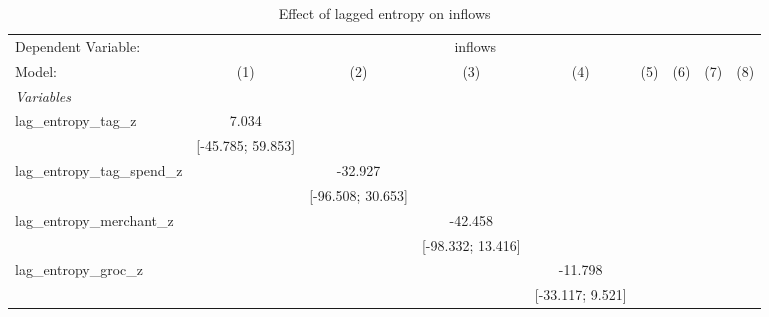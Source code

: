 
\begin{table}[htbp]
   \centering
   \tiny
   \begin{threeparttable}[b]
      \caption{\label{tab:reg_inflows_lagged} Effect of lagged entropy on inflows}
      \begin{tabular}{lcccccccc}
         \tabularnewline \midrule \midrule
         Dependent Variable: & \multicolumn{8}{c}{inflows}\\
         Model:                           & (1)                 & (2)                 & (3)                 & (4)                 & (5)                 & (6)                 & (7)                 & (8)\\  
         \midrule
         \emph{Variables}\\
         lag\_entropy\_tag\_z             & 7.034               &                     &                     &                     &                     &                     &                     &   \\   
                                          & [-45.785; 59.853]   &                     &                     &                     &                     &                     &                     &   \\   
         lag\_entropy\_tag\_spend\_z      &                     & -32.927             &                     &                     &                     &                     &                     &   \\   
                                          &                     & [-96.508; 30.653]   &                     &                     &                     &                     &                     &   \\   
         lag\_entropy\_merchant\_z        &                     &                     & -42.458             &                     &                     &                     &                     &   \\   
                                          &                     &                     & [-98.332; 13.416]   &                     &                     &                     &                     &   \\   
         lag\_entropy\_groc\_z            &                     &                     &                     & -11.798             &                     &                     &                     &   \\   
                                          &                     &                     &                     & [-33.117; 9.521]    &                     &                     &                     &   \\   

\end{tabular}
\end{threeparttable}
\end{table}
